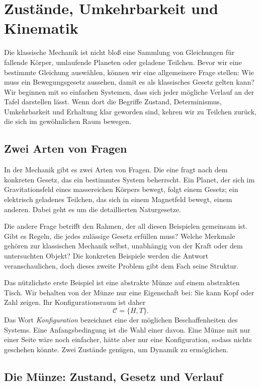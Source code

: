 \chapter{Zustände, Umkehrbarkeit und Kinematik}

Die klassische Mechanik ist nicht bloß eine Sammlung von Gleichungen für fallende Körper, umlaufende Planeten oder geladene Teilchen. Bevor wir eine bestimmte Gleichung auswählen, können wir eine allgemeinere Frage stellen: Wie muss ein Bewegungsgesetz aussehen, damit es als klassisches Gesetz gelten kann? Wir beginnen mit so einfachen Systemen, dass sich jeder mögliche Verlauf an der Tafel darstellen lässt. Wenn dort die Begriffe Zustand, Determinismus, Umkehrbarkeit und Erhaltung klar geworden sind, kehren wir zu Teilchen zurück, die sich im gewöhnlichen Raum bewegen.

\section{Zwei Arten von Fragen}

In der Mechanik gibt es zwei Arten von Fragen. Die eine fragt nach dem konkreten Gesetz, das ein bestimmtes System beherrscht. Ein Planet, der sich im Gravitationsfeld eines massereichen Körpers bewegt, folgt einem Gesetz; ein elektrisch geladenes Teilchen, das sich in einem Magnetfeld bewegt, einem anderen. Dabei geht es um die detaillierten Naturgesetze.

Die andere Frage betrifft den Rahmen, der all diesen Beispielen gemeinsam ist. Gibt es Regeln, die jedes zulässige Gesetz erfüllen muss? Welche Merkmale gehören zur klassischen Mechanik selbst, unabhängig von der Kraft oder dem untersuchten Objekt? Die konkreten Beispiele werden die Antwort veranschaulichen, doch dieses zweite Problem gibt dem Fach seine Struktur.

Das nützlichste erste Beispiel ist eine abstrakte Münze auf einem abstrakten Tisch. Wir behalten von der Münze nur eine Eigenschaft bei: Sie kann Kopf oder Zahl zeigen. Ihr Konfigurationsraum ist daher \begin{equation}
  \mathcal C=\{H,T\}.
\end{equation}Das Wort \emph{Konfiguration} bezeichnet eine der möglichen Beschaffenheiten des Systems. Eine Anfangsbedingung ist die Wahl einer davon. Eine Münze mit nur einer Seite wäre noch einfacher, hätte aber nur eine Konfiguration, sodass nichts geschehen könnte. Zwei Zustände genügen, um Dynamik zu ermöglichen.

\section{Die Münze: Zustand, Gesetz und Verlauf}

